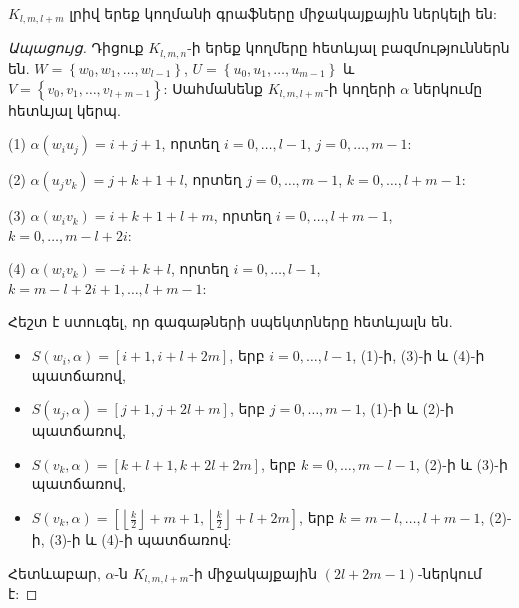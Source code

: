 \begin{theorem}
$K_{l,m,l+m}$ լրիվ երեք կողմանի գրաֆները միջակայքային ներկելի են:
\end{theorem}
\begin{proof}[Ապացույց]
Դիցուք $K_{l,m,n}$-ի երեք կողմերը հետևյալ բազմություններն են. $W = \left\{ w_0, w_1,
\ldots, w_{l-1} \right\}$, $U = \left\{ u_0, u_1,
\ldots, u_{m-1} \right\}$ և $V = \left\{ v_0, v_1, \ldots, v_{l+m-1} \right\}$: Սահմանենք $K_{l,m,l+m}$-ի կողերի $\alpha$ ներկումը հետևյալ կերպ.
\begin{description}
\item{(1)} $\alpha(w_iu_j) = i+j+1$, որտեղ $i=0,\ldots,l-1$, $j=0,\ldots,m-1$:
\item{(2)} $\alpha(u_jv_k) = j+k+1+l$, որտեղ $j=0,\ldots,m-1$, $k=0,\ldots,l+m-1$:
\item{(3)} $\alpha(w_iv_k) = i+k+1+l+m$, որտեղ $i=0,\ldots,l+m-1$, $k=0,\ldots,m-l+2i$:
\item{(4)} $\alpha(w_iv_k) = -i+k+l$, որտեղ $i=0,\ldots,l-1$, $k=m-l+2i+1,\ldots,l+m-1$:
\end{description}
Հեշտ է ստուգել, որ գագաթների սպեկտրները հետևյալն են.
\begin{itemize}
\item $S(w_i, \alpha) = [i+1, i+l+2m]$, երբ $i=0,\ldots,l-1$, (1)-ի, (3)-ի և (4)-ի պատճառով,
\item $S(u_j, \alpha) = [j+1, j+2l+m]$, երբ $j=0,\ldots,m-1$, (1)-ի և (2)-ի պատճառով, 
\item $S(v_k, \alpha) = [k+l+1, k+2l+2m]$, երբ $k=0,\ldots,m-l-1$, (2)-ի և (3)-ի պատճառով,
\item $S(v_k, \alpha) = [\left \lfloor \frac{k}{2} \right \rfloor + m + 1, 
\left \lfloor \frac{k}{2} \right \rfloor + l + 2m]$, երբ $k=m-l,\ldots,l+m-1$,
(2)-ի, (3)-ի և (4)-ի պատճառով:
\end{itemize}
Հետևաբար, $\alpha$-ն $K_{l,m,l+m}$-ի միջակայքային $(2l+2m-1)$-ներկում է:
\end{proof}

